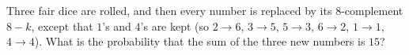 Three fair dice are rolled, and then every number is replaced by its $8$-complement $8-k$, except that $1$'s and $4$'s are kept (so $2\to6$, $3\to5$, $5\to3$, $6\to2$, $1\to1$, $4\to4$). What is the probability that the sum of the three new numbers is $15$?
